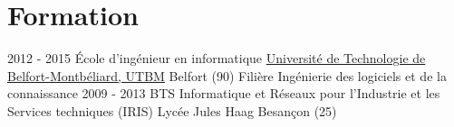 \documentclass[letterpaper]{twentysecondcv} %
\begin{document}
\makeprofile %

\section{Formation}

\begin{twenty} %
	\twentyitem
    	{2012 - 2015}
        {École d'ingénieur en informatique}
        {\href{http://www.utbm.fr/}{Université de Technologie de Belfort-Montbéliard, UTBM}}
        {Belfort (90)}
        {Filière Ingénierie des logiciels et de la connaissance}
	\twentyitem
    	{2009 - 2013}
        {BTS Informatique et Réseaux pour l'Industrie et les Services techniques (IRIS)}
        {Lycée Jules Haag}{}
        {Besançon (25)}
\end{twenty}
\end{document}
